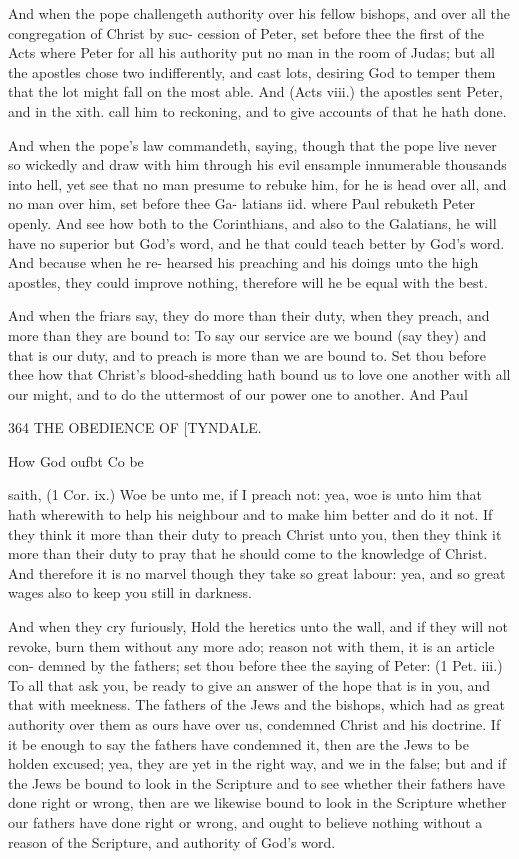\documentclass{custom}
\begin{document}
{And when the pope challengeth authority over his fellow 
bishops, and over all the congregation of Christ by suc- 
cession of Peter, set before thee the first of the Acts where 
Peter for all his authority put no man in the room of 
Judas; but all the apostles chose two indifferently, and 
cast lots, desiring God to temper them that the lot might 
fall on the most able. And (Acts viii.) the apostles sent 
Peter, and in the xith. call him to reckoning, and to give 
accounts of that he hath done. 

And when the pope's law commandeth, saying, though 
that the pope live never so wickedly and draw with him 
through his evil ensample innumerable thousands into hell, 
yet see that no man presume to rebuke him, for he is head 
over all, and no man over him, set before thee Ga- 
latians iid. where Paul rebuketh Peter openly. And see 
how both to the Corinthians, and also to the Galatians, he 
will have no superior but God's word, and he that could
teach better by God's word. And because when he re-
hearsed his preaching and his doings unto the high apostles,
they could improve nothing, therefore will he be equal 
with the best. 

And when the friars say, they do more than their duty,
when they preach, and more than they are bound to: To
say our service are we bound (say they) and that is our
duty, and to preach is more than we are bound to. Set 
thou before thee how that Christ's blood-shedding hath 
bound us to love one another with all our might, and to do 
the uttermost of our power one to another. And Paul 


364
THE OBEDIENCE OF
[TYNDALE.

How God 
oufbt Co be 

saith, (1 Cor. ix.) Woe be unto me, if I preach not: yea, 
woe is unto him that hath wherewith to help his neighbour 
and to make him better and do it not. If they think it 
more than their duty to preach Christ unto you, then they 
think it more than their duty to pray that he should come 
to the knowledge of Christ. And therefore it is no marvel 
though they take so great labour: yea, and so great wages 
also to keep you still in darkness. 

And when they cry furiously, Hold the heretics unto 
the wall, and if they will not revoke, burn them without 
any more ado; reason not with them, it is an article con- 
demned by the fathers; set thou before thee the saying 
of Peter: (1 Pet. iii.) To all that ask you, be ready to 
give an answer of the hope that is in you, and that with 
meekness. The fathers of the Jews and the bishops, 
which had as great authority over them as ours have over 
us, condemned Christ and his doctrine. If it be enough 
to say the fathers have condemned it, then are the Jews 
to be holden excused; yea, they are yet in the right way, 
and we in the false; but and if the Jews be bound to 
look in the Scripture and to see whether their fathers 
have done right or wrong, then are we likewise bound to 
look in the Scripture whether our fathers have done right 
or wrong, and ought to believe nothing without a reason 
of the Scripture, and authority of God's word. 

}
\end{document}
